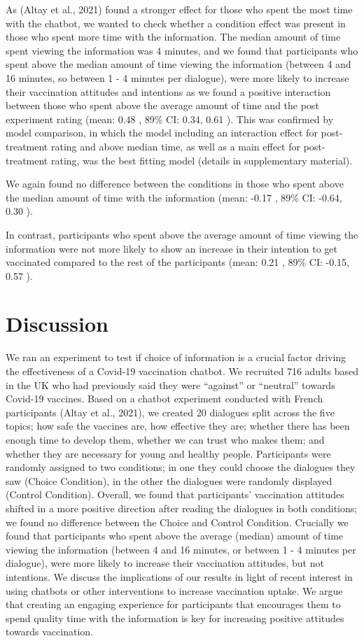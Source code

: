 \documentclass[
  english,
  ,jou,floatsintext]{apa6}
\begin{document}
As (Altay et al., 2021) found a stronger effect for those who spent the most time with the chatbot, we wanted to check whether a condition effect was present in those who spent more time with the information. The median amount of time spent viewing the information was 4 minutes, and we found that participants who spent above the median amount of time viewing the information (between 4 and 16 minutes, so between 1 - 4 minutes per dialogue), were more likely to increase their vaccination attitudes and intentions as we found a positive interaction between those who spent above the average amount of time and the post experiment rating (mean: 0.48 , 89\% CI: 0.34, 0.61 ). This was confirmed by model comparison, in which the model including an interaction effect for post-treatment rating and above median time, as well as a main effect for post-treatment rating, was the best fitting model (details in supplementary material).

We again found no difference between the conditions in those who spent above the median amount of time with the information (mean: -0.17 , 89\% CI: -0.64, 0.30 ).

In contrast, participants who spent above the average amount of time viewing the information were not more likely to show an increase in their intention to get vaccinated compared to the rest of the participants (mean: 0.21 , 89\% CI: -0.15, 0.57 ).

\hypertarget{discussion}{%
\section{Discussion}\label{discussion}}

We ran an experiment to test if choice of information is a crucial factor driving the effectiveness of a Covid-19 vaccination chatbot. We recruited 716 adults based in the UK who had previously said they were ``against'' or ``neutral'' towards Covid-19 vaccines. Based on a chatbot experiment conducted with French participants (Altay et al., 2021), we created 20 dialogues split across the five topics; how safe the vaccines are, how effective they are; whether there has been enough time to develop them, whether we can trust who makes them; and whether they are necessary for young and healthy people. Participants were randomly assigned to two conditions; in one they could choose the dialogues they saw (Choice Condition), in the other the dialogues were randomly displayed (Control Condition). Overall, we found that participants' vaccination attitudes shifted in a more positive direction after reading the dialogues in both conditions; we found no difference between the Choice and Control Condition. Crucially we found that participants who spent above the average (median) amount of time viewing the information (between 4 and 16 minutes, or between 1 - 4 minutes per dialogue), were more likely to increase their vaccination attitudes, but not intentions. We discuss the implications of our results in light of recent interest in using chatbots or other interventions to increase vaccination uptake. We argue that creating an engaging experience for participants that encourages them to spend quality time with the information is key for increasing positive attitudes towards vaccination.
\end{document}
